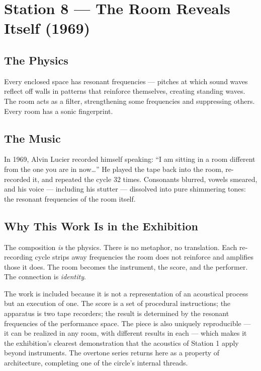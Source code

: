 \documentclass[11pt]{article}
\begin{document}
\section{Station 8 --- The Room Reveals Itself (1969)}

\subsection{The Physics}
Every enclosed space has resonant frequencies --- pitches at which sound waves reflect off
walls in patterns that reinforce themselves, creating standing waves. The room acts as a
filter, strengthening some frequencies and suppressing others. Every room has a sonic
fingerprint.

\subsection{The Music}
In 1969, Alvin Lucier recorded himself speaking: ``I am sitting in a room different from the
one you are in now\ldots'' He played the tape back into the room, re-recorded it, and
repeated the cycle 32 times. Consonants blurred, vowels smeared, and his voice --- including
his stutter --- dissolved into pure shimmering tones: the resonant frequencies of the room
itself.

\subsection{Why This Work Is in the Exhibition}
The composition \emph{is} the physics. There is no metaphor, no translation. Each
re-recording cycle strips away frequencies the room does not reinforce and amplifies those it
does. The room becomes the instrument, the score, and the performer. The connection is
\emph{identity}.

The work is included because it is not a representation of an acoustical process but an
execution of one. The score is a set of procedural instructions; the apparatus is two tape
recorders; the result is determined by the resonant frequencies of the performance space. The
piece is also uniquely reproducible --- it can be realized in any room, with different
results in each --- which makes it the exhibition's clearest demonstration that the acoustics
of Station 1 apply beyond instruments. The overtone series returns here as a property of
architecture, completing one of the circle's internal threads.
\end{document}
